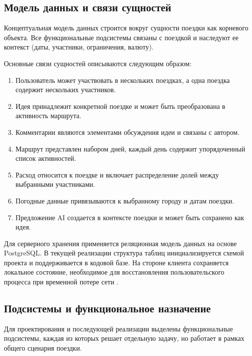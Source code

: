\subsection{Модель данных и связи сущностей}
Концептуальная модель данных строится вокруг сущности поездки как корневого объекта. Все функциональные подсистемы связаны с поездкой и наследуют ее контекст (даты, участники, ограничения, валюту).

Основные связи сущностей описываются следующим образом:
\begin{enumerate}
    \item Пользователь может участвовать в нескольких поездках, а одна поездка содержит нескольких участников.
    \item Идея принадлежит конкретной поездке и может быть преобразована в активность маршрута.
    \item Комментарии являются элементами обсуждения идеи и связаны с автором.
    \item Маршрут представлен набором дней, каждый день содержит упорядоченный список активностей.
    \item Расход относится к поездке и включает распределение долей между выбранными участниками.
    \item Погодные данные привязываются к выбранному городу и датам поездки.
    \item Предложение AI создается в контексте поездки и может быть сохранено как идея.
\end{enumerate}

Для серверного хранения применяется реляционная модель данных на основе PostgreSQL. В текущей реализации структура таблиц инициализируется схемой проекта и поддерживается в кодовой базе. На стороне клиента сохраняется локальное состояние, необходимое для восстановления пользовательского процесса при временной потере сети .

\subsection{Подсистемы и функциональное назначение}
Для проектирования и последующей реализации выделены функциональные подсистемы, каждая из которых решает отдельную задачу, но работает в рамках общего сценария поездки.

